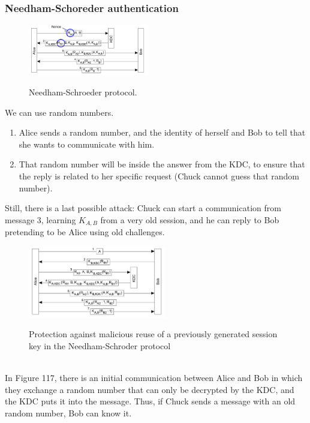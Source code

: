\documentclass[10pt,a4paper]{article}
\begin{document}
\subsubsection{Needham-Schoreder authentication}
\begin{figure}[h!]\hfill \includegraphics[width=150pt]{images/kdc4.png}\hspace*{\fill}
  \label{fig:kdc4}
  \caption{Needham-Schroeder protocol.}
\end{figure} 
We can use random numbers.
\begin{enumerate}
	\item Alice sends a random number, and the identity of herself and Bob to tell that she wants to communicate with him.
	\item That random number will be inside the answer from the KDC, to ensure that the reply is related to her specific request (Chuck cannot guess that random number).
\end{enumerate}
Still, there is a last possible attack: Chuck can start a communication from message 3, learning $K_{A,B}$ from a very old session, and he can reply to Bob pretending to be Alice using old challenges.
\begin{figure}[h!]\hfill \includegraphics[width=170pt]{images/kdc5.png}\hspace*{\fill}
  \label{fig:kdc5}
  \caption{Protection against malicious reuse of a previously generated session key in the Needham-Schroder protocol}
\end{figure}  \\
In Figure 117, there is an initial communication between Alice and Bob in which they exchange a random number that can only be decrypted by the KDC, and the KDC puts it into the message. Thus, if Chuck sends a message with an old random number, Bob can know it.
\pagebreak
\end{document}
